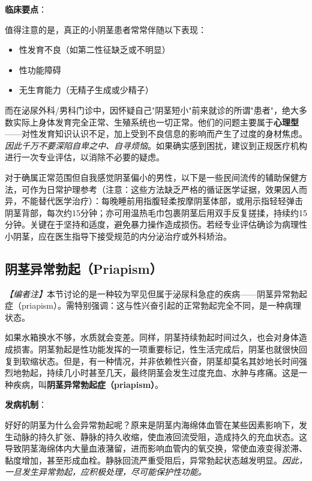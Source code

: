 \vspace{0.5em}
\noindent\textbf{临床要点}：

值得注意的是，真正的小阴茎患者常常伴随以下表现：
\begin{itemize}
	\item 性发育不良（如第二性征缺乏或不明显）
	\item 性功能障碍
	\item 无生育能力（无精子生成或少精子）
\end{itemize}

而在泌尿外科/男科门诊中，因怀疑自己"阴茎短小"前来就诊的所谓"患者"，绝大多数实际上身体发育完全正常、生殖系统也一切正常。他们的问题主要属于\textbf{心理型}——对性发育知识认识不足，加上受到不良信息的影响而产生了过度的身材焦虑。\textit{因此千万不要深陷自卑之中、自寻烦恼}。如果确实感到困扰，建议到正规医疗机构进行一次专业评估，以消除不必要的疑虑。

\begin{tcolorbox}[colback=pink!5!white,colframe=red!50!black,title=贴心小叮咛]
对于确属正常范围但自我感觉阴茎偏小的男性，以下是一些民间流传的辅助保健方法，可作为日常护理参考（注意：这些方法缺乏严格的循证医学证据，效果因人而异，不能替代医学治疗）：每晚睡前用指腹轻柔按摩阴茎体部，或用示指轻轻弹击阴茎背部，每次约15分钟；亦可用温热毛巾包裹阴茎后用双手反复搓揉，持续约15分钟。关键在于坚持和适度，避免暴力操作造成损伤。若经专业评估确诊为病理性小阴茎，应在医生指导下接受规范的内分泌治疗或外科矫治。
\end{tcolorbox}

\subsection{阴茎异常勃起（Priapism）}

\noindent\textit{【编者注】}本节讨论的是一种较为罕见但属于泌尿科急症的疾病——阴茎异常勃起症（priapism）。需特别强调：这与性兴奋引起的正常勃起完全不同，是一种病理状态。

\vspace{0.5em}
如果水箱换水不够，水质就会变差。同样，阴茎持续勃起时间过久，也会对身体造成损害。阴茎勃起是性功能发挥的一项重要标记，性生活完成后，阴茎也就很快回复到软缩状态。但是，有一种情况，并非依赖性兴奋，阴茎却莫名其妙地长时间强烈地勃起，持续几小时甚至几天，最终阴茎会发生过度充血、水肿与疼痛。这是一种疾病，叫\textbf{阴茎异常勃起症（priapism）}。

\vspace{0.5em}
\noindent\textbf{发病机制}：

好好的阴茎为什么会异常勃起呢？原来是阴茎内海绵体血管在某些因素影响下，发生动脉的持久扩张、静脉的持久收缩，使血液回流受阻，造成持久的充血状态。这导致阴茎海绵体内大量血液潴留，进而影响血管内的氧交换，常使血液变得淤滞、黏度增加，甚至形成血栓。静脉回流严重受阻后，异常勃起状态越发明显。\textit{因此，一旦发生异常勃起，应积极处理，尽可能保护性功能。}


